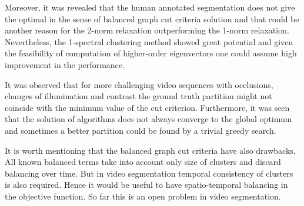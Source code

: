 Moreover, it was revealed that the human annotated segmentation does not give the optimal in the sense of balanced graph cut criteria solution 
and that could be another reason for the 2-norm relaxation outperforming the 1-norm relaxation.
Nevertheless, the 1-spectral clustering method showed great potential and given the feasibility of computation of higher-order eigenvectors one could assume high improvement in the performance.

It was observed that for more challenging video sequences with occlusions,
changes of illumination and contrast the ground truth partition might not coincide with the minimum value of the cut criterion. Furthermore, it was seen that the solution of algorithms does not always converge
to the global optimum and sometimes a better partition could be found by a trivial greedy search. 

It is worth mentioning that the balanced graph cut criteria have also drawbacks. All known balanced terms take into account only size of clusters and discard balancing over time. 
But in video segmentation temporal consistency of clusters is also required. Hence it would be useful to have spatio-temporal balancing in the objective function.
So far this is an open problem in video segmentation.